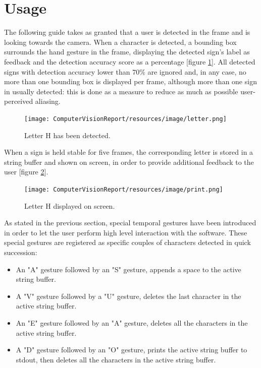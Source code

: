 \documentclass[a4paper, 12pt]{article}
\begin{document}
\section{Usage}
\label{Usage}
The following guide takes as granted that a user is detected in the frame and is looking towards the camera.\linebreak
When a character is detected, a bounding box surrounds the hand gesture in the frame, displaying the detected sign's label as feedback and the detection accuracy score as a percentage [figure \ref{fig:letter}].\linebreak
All detected signs with detection accuracy lower than $70\%$ are ignored and, in any case, no more than one bounding box is displayed per frame, although more than one sign in usually detected: this is done as a measure to reduce as much as possible user-perceived aliasing.\linebreak

\begin{figure}[!h]
    \centering
    \texttt{[image: ComputerVisionReport/resources/image/letter.png]} \caption{Letter H has been detected.} \label{fig:letter}
\end{figure}

When a sign is held stable for five frames, the corresponding letter is stored in a string buffer and shown on screen, in order to provide additional feedback to the user [figure \ref{fig:print}].\linebreak

\begin{figure}[H]
    \centering
    \texttt{[image: ComputerVisionReport/resources/image/print.png]} \caption{Letter H displayed on screen.} \label{fig:print}
\end{figure}

As stated in the previous section, special temporal gestures have been introduced in order to let the user perform high level interaction with the software. These special gestures are registered as specific couples of characters detected in quick succession:\linebreak
\begin{itemize}
\item An "A" gesture followed by an "S" gesture, appends a space to the active string buffer.
\item A "V" gesture followed by a "U" gesture, deletes the last character in the active string buffer.
\item An "E" gesture followed by an "A" gesture, deletes all the characters in the active string buffer.
\item A "D" gesture followed by an "O" gesture, prints the active string buffer to stdout, then deletes all the characters in the active string buffer.
\end{itemize}
\end{document}
